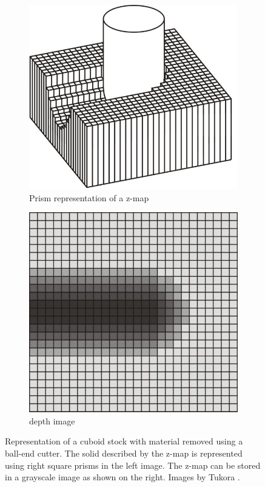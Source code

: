 \begin{description}
	\begin{figure}[h]
		\centering
		\begin{subfigure}[b]{0.4\textwidth}
			\includegraphics[width=\textwidth]{images/zmap}
			\caption{Prism representation of a z-map}
			\label{fig:zmap}
		\end{subfigure}
		\begin{subfigure}[b]{0.4\textwidth}
			\includegraphics[width=\textwidth]{images/depth_image}
			\caption{depth image}
			\label{fig:depth_image}
		\end{subfigure}
		\caption{
			Representation of a cuboid stock with material removed using a ball-end cutter.
			The solid described by the z-map is represented using right square prisms in the left image.
			The z-map can be stored in a grayscale image as shown on the right.
			Images by Tukora \cite{virtual_machining_review}.
		}
	\end{figure}
	

\end{description}

